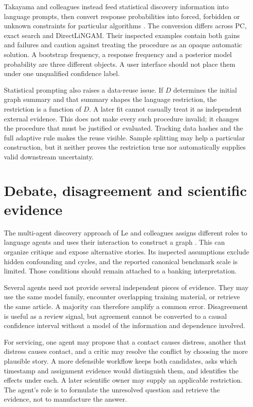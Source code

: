 Takayama and colleagues instead feed statistical discovery information into
language prompts, then convert response probabilities into forced, forbidden
or unknown constraints for particular algorithms
\cite{v12_la_2402_01454}. The conversion differs across PC, exact search and
DirectLiNGAM. Their inspected examples contain both gains and failures and
caution against treating the procedure as an opaque automatic solution.
A bootstrap frequency, a response frequency and a posterior model probability
are three different objects. A user interface should not place them under one
unqualified confidence label.

Statistical prompting also raises a data-reuse issue. If $D$ determines the
initial graph summary and that summary shapes the language restriction, the
restriction is a function of $D$. A later fit cannot casually treat it as
independent external evidence. This does not make every such procedure
invalid; it changes the procedure that must be justified or evaluated.
Tracking data hashes and the full adaptive rule makes the reuse visible.
Sample splitting may help a particular construction, but it neither proves the
restriction true nor automatically supplies valid downstream uncertainty.

\section{Debate, disagreement and scientific evidence}

The multi-agent discovery approach of Le and colleagues assigns different
roles to language agents and uses their interaction to construct a graph
\cite{v12_la_2407_15073}. This can organize critique and expose alternative
stories. Its inspected assumptions exclude hidden confounding and cycles, and
the reported canonical benchmark scale is limited. Those conditions should
remain attached to a banking interpretation.

Several agents need not provide several independent pieces of evidence. They
may use the same model family, encounter overlapping training material, or
retrieve the same article. A majority can therefore amplify a common error.
Disagreement is useful as a review signal, but agreement cannot be converted
to a causal confidence interval without a model of the information and
dependence involved.

For servicing, one agent may propose that a contact causes distress, another
that distress causes contact, and a critic may resolve the conflict by choosing
the more plausible story. A more defensible workflow keeps both candidates,
asks which timestamp and assignment evidence would distinguish them, and
identifies the effects under each. A later scientific owner may supply an
applicable restriction. The agent's role is to formulate the unresolved
question and retrieve the evidence, not to manufacture the answer.

